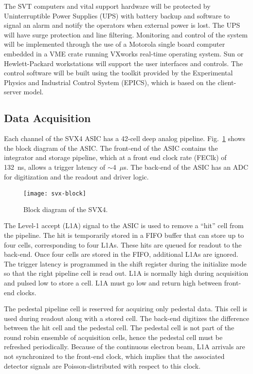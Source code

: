 The SVT computers and vital support hardware will be protected by 
Uninterruptible Power Supplies (UPS) with battery backup and software to 
signal an alarm and notify the operators when external power is lost.
The UPS will have surge protection and line filtering.  Monitoring and 
control of the system will be implemented through the use of a Motorola 
single board computer embedded in a VME crate running VXworks real-time 
operating system.  Sun or Hewlett-Packard workstations will support the 
user interfaces and controls.  The control software will be built using 
the toolkit provided by the Experimental Physics and Industrial Control 
System (EPICS), which is based on the client-server model.

\subsection{Data Acquisition}
\label{svt:daq}

Each channel of the SVX4 ASIC has a 42-cell deep analog pipeline.
Fig.~\ref{fig:svx-block} shows the block diagram of the ASIC.  The 
front-end of the ASIC contains the integrator and storage pipeline, which 
at a front end clock rate (FEClk) of 132~ns, allows a trigger latency of 
$\sim$4~$\mu$s.  The back-end of the ASIC has an ADC for digitization and 
the readout and driver logic.

\begin{figure}[htbp] 
\centering
\texttt{[image: svx-block]}
\caption{\small{Block diagram of the SVX4.}}
\label{fig:svx-block}
\end{figure}

The Level-1 accept (L1A) signal to the ASIC is used to remove a ``hit'' 
cell from the pipeline.  The hit is temporarily stored in a FIFO buffer 
that can store up to four cells, corresponding to four L1As.  These hits 
are queued for readout to the back-end.  Once four cells are stored in 
the FIFO, additional L1As are ignored.  The trigger latency is programmed 
in the shift register during the initialize mode so that the right pipeline 
cell is read out.  L1A is normally high during acquisition and pulsed low 
to store a cell.  L1A must go low and return high between front-end clocks.  

The pedestal pipeline cell is reserved for acquiring only pedestal data.  
This cell is used during readout along with a stored cell.  The back-end 
digitizes the difference between the hit cell and the pedestal cell.  The 
pedestal cell is not part of the round robin ensemble of acquisition cells, 
hence the pedestal cell must be refreshed periodically.  Because of the 
continuous electron beam, L1A arrivals are not synchronized to the 
front-end clock, which implies that the associated detector signals are 
Poisson-distributed with respect to this clock.

